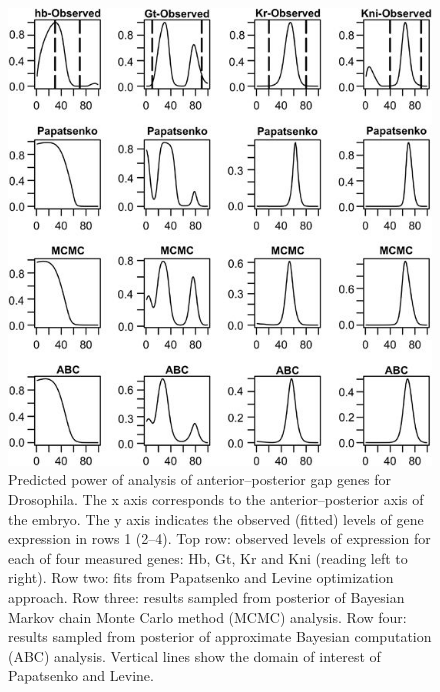 \begin{figure}
    \centering
    \includegraphics[scale=0.75]{tex/review/hdy201352f2.jpg}
    \caption{Predicted power of analysis of anterior–posterior gap genes for Drosophila. The x axis corresponds to the anterior–posterior axis of the embryo. The y axis indicates the observed (fitted) levels of gene expression in rows 1 (2–4). Top row: observed levels of expression for each of four measured genes: Hb, Gt, Kr and Kni (reading left to right). Row two: fits from Papatsenko and Levine optimization approach. Row three: results sampled from posterior of Bayesian Markov chain Monte Carlo method (MCMC) analysis. Row four: results sampled from posterior of approximate Bayesian computation (ABC) analysis. Vertical lines show the domain of interest of Papatsenko and Levine.}
    \label{fig:review2}
\end{figure}

